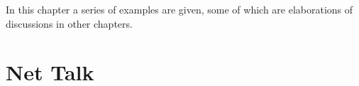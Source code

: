 In this chapter a series of examples are given, some of which are elaborations of discussions in other chapters.


\section{Net Talk}

